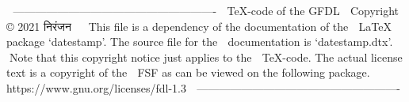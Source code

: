 ^^A -------------------------------------------------------
^^A TeX-code of the GFDL
^^A Copyright © 2021 निरंजन
^^A
^^A This file is a dependency of the documentation of the
^^A LaTeX package `datestamp'. The source file for the
^^A documentation is `datestamp.dtx'.
^^A
^^A Note that this copyright notice just applies to the
^^A TeX-code. The actual license text is a copyright of the
^^A FSF as can be viewed on the following package.
^^A
^^A https://www.gnu.org/licenses/fdl-1.3
^^A -------------------------------------------------------
%   
%   
%   
%   
%   
% 
% 
% 
% 
% 
